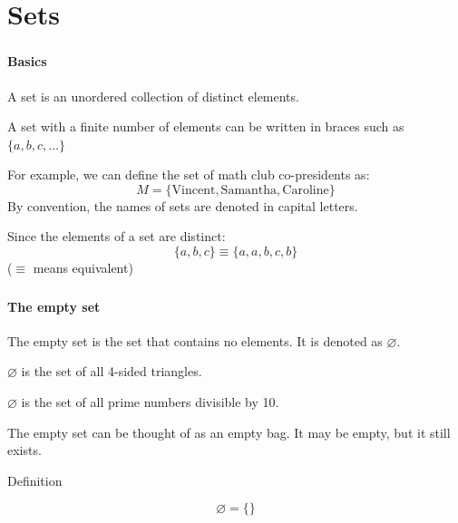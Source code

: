 \documentclass[mathserif]{beamer}
\newenvironment{compactmath}[1][\normalsize]%
	{\begin{minipage}{\textwidth}\vspace{-0.75\baselineskip}#1\begin{equation*}}
	{\end{equation*}\end{minipage}}
\begin{document}
	\section{Sets}
	\begin{frame}
		\frametitle{\secname}
		\framesubtitle{Basics}
		A set is an unordered collection of distinct elements.

		A set with a finite number of elements can be written in braces such as $\{a, b, c, \dots\}$

		For example, we can define the set of math club co-presidents as:
		\[M = \{\text{Vincent}, \text{Samantha}, \text{Caroline}\}\]
		By convention, the names of sets are denoted in capital letters.

		Since the elements of a set are distinct:
		\[\{a, b, c\} \equiv \{a, a, b, c, b\}\]
		($\equiv$ means equivalent)
	\end{frame}
	\begin{frame}
		\frametitle{\secname}
		\framesubtitle{The empty set}
		The empty set is the set that contains no elements. It is denoted as $\varnothing$.
		
		\begin{examples}
			$\varnothing$ is the set of all 4-sided triangles.

			$\varnothing$ is the set of all prime numbers divisible by 10.
		\end{examples}
		The empty set can be thought of as an empty bag. It may be empty, but it still exists.
		\begin{block}{Definition}
			\begin{compactmath}[\Huge]
				\varnothing = \{\}
			\end{compactmath}
		\end{block}
	\end{frame}
\end{document}

